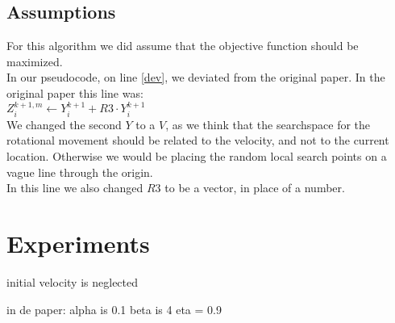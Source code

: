 \documentclass[runningheads]{llncs}
\begin{document}
\newpage
\subsection{Assumptions}
For this algorithm we did assume that the objective function should be maximized.\\
In our pseudocode, on line \ref{dev}, we deviated from the original paper. In the original paper this line was: \\
$Z_i^{k+1, m} \leftarrow Y_i^{k+1} + R3 \cdot Y_i^{k+1}$ \\
We changed the second $ Y $ to a $V$, as we think that the searchspace for the rotational movement should be related to the velocity, and not to the current location. Otherwise we would be placing the random local search points on a vague line through the origin. \\ %
In this line we also changed $R3$ to be a vector, in place of a number. \\


\section{Experiments}


initial velocity is neglected

in de paper:
alpha is 0.1
beta is 4
eta = 0.9

\end{document}
